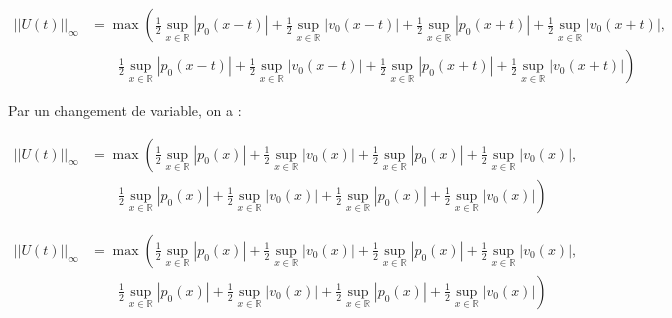 \documentclass[a4paper,11pt]{article}
\begin{document}
\begin{displaymath}
    \begin{split}
        ||U(t)||_{\infty} &= \max \left( \frac{1}{2}\sup_{x \in \mathbb{R}}|p_0(x-t)| + \frac{1}{2}\sup_{x \in \mathbb{R}} |v_0(x-t)| + \frac{1}{2}\sup_{x \in \mathbb{R}}|p_0(x+t)| + \frac{1}{2}\sup_{x \in \mathbb{R}}|v_0(x+t)| \right. , \\
        & \qquad \left. \frac{1}{2}\sup_{x \in \mathbb{R}}|p_0(x-t)| + \frac{1}{2}\sup_{x \in \mathbb{R}}|v_0(x-t)| + \frac{1}{2}\sup_{x \in \mathbb{R}}|p_0(x+t)| + \frac{1}{2}\sup_{x \in \mathbb{R}}|v_0(x+t)| \right)
    \end{split}
\end{displaymath}


Par un changement de variable, on a :

\begin{displaymath}
    \begin{split}
        ||U(t)||_{\infty} &= \max \left( \frac{1}{2}\sup_{x \in \mathbb{R}}|p_0(x)| + \frac{1}{2}\sup_{x \in \mathbb{R}} |v_0(x)| + \frac{1}{2}\sup_{x \in \mathbb{R}}|p_0(x)| + \frac{1}{2}\sup_{x \in \mathbb{R}}|v_0(x)| \right. , \\
        & \qquad \left. \frac{1}{2}\sup_{x \in \mathbb{R}}|p_0(x)| + \frac{1}{2}\sup_{x \in \mathbb{R}}|v_0(x)| + \frac{1}{2}\sup_{x \in \mathbb{R}}|p_0(x)| + \frac{1}{2}\sup_{x \in \mathbb{R}}|v_0(x)| \right)
    \end{split}
\end{displaymath}

\begin{displaymath}
    \begin{split}
        ||U(t)||_{\infty} &= \max \left( \frac{1}{2}\sup_{x \in \mathbb{R}}|p_0(x)| + \frac{1}{2}\sup_{x \in \mathbb{R}} |v_0(x)| + \frac{1}{2}\sup_{x \in \mathbb{R}}|p_0(x)| + \frac{1}{2}\sup_{x \in \mathbb{R}}|v_0(x)| \right. , \\
        & \qquad \left. \frac{1}{2}\sup_{x \in \mathbb{R}}|p_0(x)| + \frac{1}{2}\sup_{x \in \mathbb{R}}|v_0(x)| + \frac{1}{2}\sup_{x \in \mathbb{R}}|p_0(x)| + \frac{1}{2}\sup_{x \in \mathbb{R}}|v_0(x)| \right)
    \end{split}
\end{displaymath}
\end{document}
